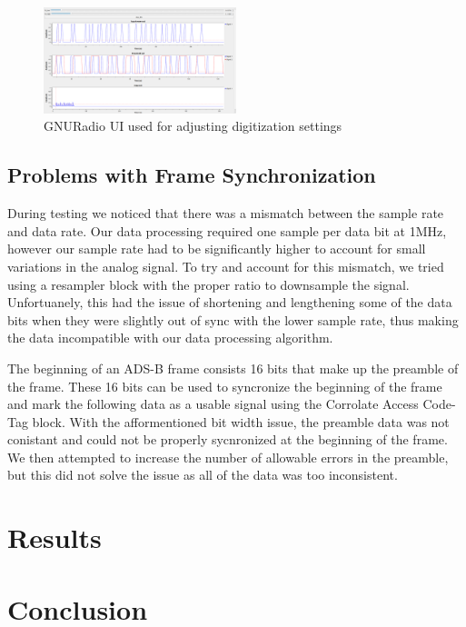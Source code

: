 \documentclass[journal, onecolumn]{IEEEtran}
\begin{document}
\begin{figure}
  \begin{center}
    \includegraphics[width=0.5\textwidth]{./figures/fig_gnuradio_fullUI.png}
  \end{center}
  \caption{GNURadio UI used for adjusting digitization settings}\label{fig:receive_UI}
\end{figure}

\subsection{Problems with Frame Synchronization}
During testing we noticed that there was a mismatch between the sample rate and data rate. Our data processing required one sample per data bit at 1MHz, however our sample rate had to be significantly higher to account for small variations in the analog signal. To try and account for this mismatch, we tried using a resampler block with the proper ratio to downsample the signal. Unfortuanely, this had the issue of shortening and lengthening some of the data bits when they were slightly out of sync with the lower sample rate, thus making the data incompatible with our data processing algorithm.  

The beginning of an ADS-B frame consists 16 bits that make up the preamble of the frame. These 16 bits can be used to syncronize the beginning of the frame and mark the following data as a usable signal using the Corrolate Access Code-Tag block. With the afformentioned bit width issue, the preamble data was not conistant and could not be properly sycnronized at the beginning of the frame. We then attempted to increase the number of allowable errors in the preamble, but this did not solve the issue as all of the data was too inconsistent.
\section{Results}

\section{Conclusion}







\end{document}
